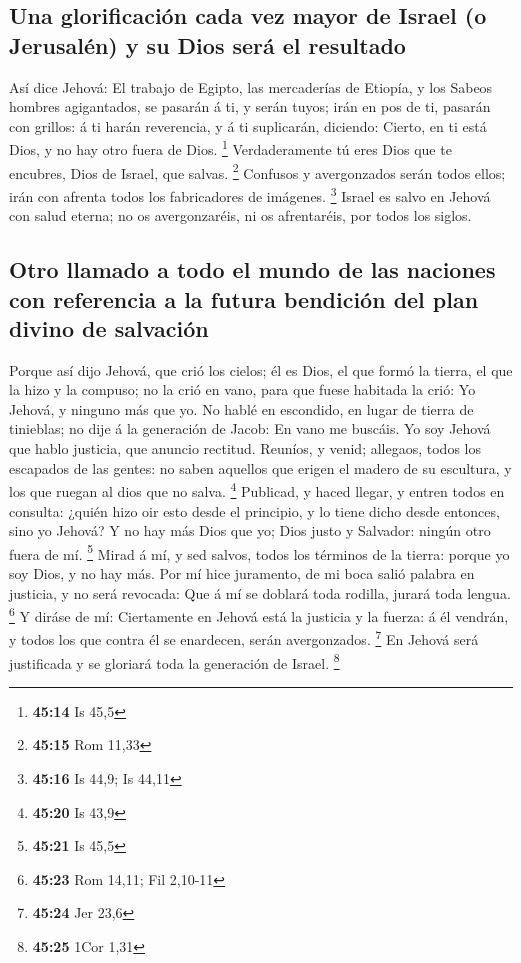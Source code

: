 \hypertarget{una-glorificaciuxf3n-cada-vez-mayor-de-israel-o-jerusaluxe9n-y-su-dios-seruxe1-el-resultado}{%
\subsection{Una glorificación cada vez mayor de Israel (o Jerusalén) y
su Dios será el
resultado}\label{una-glorificaciuxf3n-cada-vez-mayor-de-israel-o-jerusaluxe9n-y-su-dios-seruxe1-el-resultado}}

 Así dice Jehová: El trabajo de Egipto, las mercaderías de
Etiopía, y los Sabeos hombres agigantados, se pasarán á ti, y serán
tuyos; irán en pos de ti, pasarán con grillos: á ti harán reverencia, y
á ti suplicarán, diciendo: Cierto, en ti está Dios, y no hay otro fuera
de Dios. \footnote{\textbf{45:14} Is 45,5}  Verdaderamente
tú eres Dios que te encubres, Dios de Israel, que salvas. \footnote{\textbf{45:15}
  Rom 11,33}  Confusos y avergonzados serán todos ellos;
irán con afrenta todos los fabricadores de imágenes. \footnote{\textbf{45:16}
  Is 44,9; Is 44,11}  Israel es salvo en Jehová con salud
eterna; no os avergonzaréis, ni os afrentaréis, por todos los siglos.

\hypertarget{otro-llamado-a-todo-el-mundo-de-las-naciones-con-referencia-a-la-futura-bendiciuxf3n-del-plan-divino-de-salvaciuxf3n}{%
\subsection{Otro llamado a todo el mundo de las naciones con referencia
a la futura bendición del plan divino de
salvación}\label{otro-llamado-a-todo-el-mundo-de-las-naciones-con-referencia-a-la-futura-bendiciuxf3n-del-plan-divino-de-salvaciuxf3n}}

 Porque así dijo Jehová, que crió los cielos; él es Dios,
el que formó la tierra, el que la hizo y la compuso; no la crió en vano,
para que fuese habitada la crió: Yo Jehová, y ninguno más que yo.
 No hablé en escondido, en lugar de tierra de tinieblas; no
dije á la generación de Jacob: En vano me buscáis. Yo soy Jehová que
hablo justicia, que anuncio rectitud.  Reuníos, y venid;
allegaos, todos los escapados de las gentes: no saben aquellos que
erigen el madero de su escultura, y los que ruegan al dios que no salva.
\footnote{\textbf{45:20} Is 43,9}  Publicad, y haced
llegar, y entren todos en consulta: ¿quién hizo oir esto desde el
principio, y lo tiene dicho desde entonces, sino yo Jehová? Y no hay más
Dios que yo; Dios justo y Salvador: ningún otro fuera de mí. \footnote{\textbf{45:21}
  Is 45,5}  Mirad á mí, y sed salvos, todos los términos de
la tierra: porque yo soy Dios, y no hay más.  Por mí hice
juramento, de mi boca salió palabra en justicia, y no será revocada: Que
á mí se doblará toda rodilla, jurará toda lengua. \footnote{\textbf{45:23}
  Rom 14,11; Fil 2,10-11}  Y diráse de mí: Ciertamente en
Jehová está la justicia y la fuerza: á él vendrán, y todos los que
contra él se enardecen, serán avergonzados. \footnote{\textbf{45:24} Jer
  23,6}  En Jehová será justificada y se gloriará toda la
generación de Israel. \footnote{\textbf{45:25} 1Cor 1,31}

